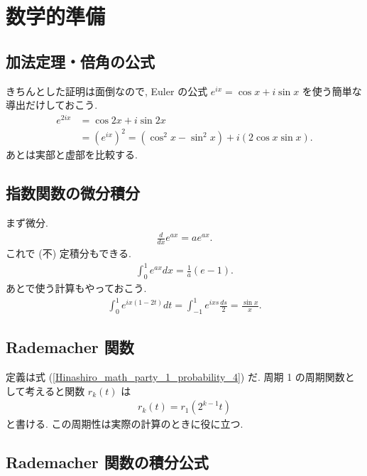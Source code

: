 \documentclass[openany, a4paper, oneside]{jsbook}
\theoremstyle{break}
\theoremstyle{breakdefn}
\newcommand{\rbk}[1]{\left (#1\right)}
\begin{document}
\section{数学的準備}

\subsection{加法定理・倍角の公式 \label{Hinashiro_math_party_1_probability_17}}


きちんとした証明は面倒なので, Euler の公式 $e^{ix} = \cos x + i \sin x$ を使う簡単な導出だけしておこう.
\begin{align}
 e^{2 i x}
 &=
 \cos 2x + i \sin 2x \\
 &=
 \rbk{e^{ix}}^2
 =
 \rbk{ \cos^2 x - \sin^2 x} + i \rbk{2 \cos x \sin x}.
\end{align}
あとは実部と虚部を比較する.
\subsection{指数関数の微分積分}


まず微分.
\begin{align}
 \frac{d}{dx} e^{ax} = a e^{ax}.
\end{align}
これで (不) 定積分もできる.
\begin{align}
 \int_0^1 e^{ax} dx = \frac{1}{a} \rbk{e - 1}.
\end{align}
あとで使う計算もやっておこう.
\begin{align}
 \int_0^1 e^{ix (1 - 2t)} dt
 =
 \int_{-1}^{1} e^{ixs} \frac{ds}{2}
 =
 \frac{\sin x}{x}.
\end{align}
\subsection{Rademacher 関数}


定義は式 (\ref{Hinashiro_math_party_1_probability_4}) だ.
周期 1 の周期関数として考えると関数 $r_k (t)$ は
\begin{align}
 r_k (t) = r_1 (2^{k-1} t) \label{Hinashiro_math_party_1_probability_11}
\end{align}
と書ける.
この周期性は実際の計算のときに役に立つ.
\subsection{Rademacher 関数の積分公式 \label{Hinashiro_math_party_1_probability_16}}
\end{document}
